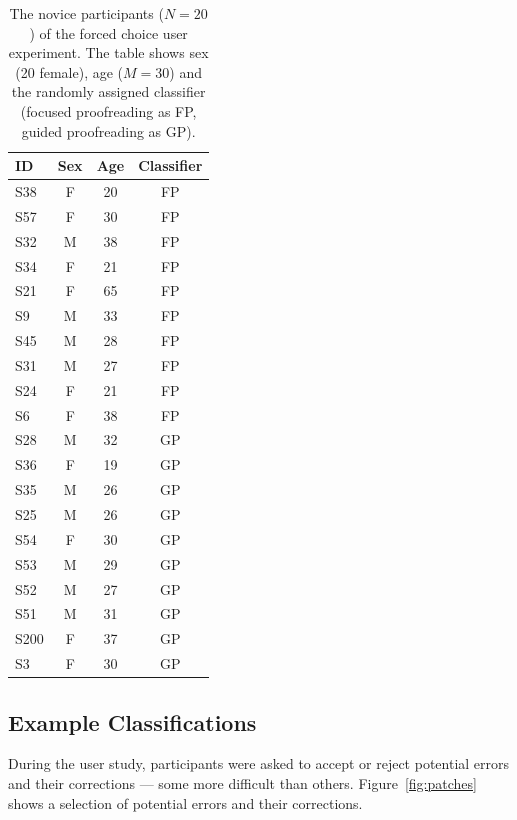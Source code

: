 \begin{table}[t]
\caption{The novice participants ($N=20$) of the forced choice user experiment. The table shows sex (20 female), age ($M=30$) and the randomly assigned classifier (focused proofreading as FP, guided proofreading as GP).}%

\small{
\begin{tabular}{@{}l|c|c|c@{}}
	\toprule
     \textbf{ID} & \textbf{Sex} &  \textbf{Age} & \textbf{Classifier}  \\ \midrule	
S38 &		F & 20 & FP \\
S57&		F & 30 & FP \\ 
S32&		M & 38 & FP \\
S34&		F & 21 & FP \\
S21&		F & 65 & FP \\
S9 &	M & 33 & FP \\
S45 &		M & 28 & FP \\
S31&		M & 27 & FP \\
S24&		F & 21 & FP \\
S6	&	F & 38 & FP \\
S28	&	M&	32& GP \\
S36	&	F&	19& GP \\
S35	&	M&	26& GP \\
S25	&	M&	26& GP \\
S54	&	F&	30& GP \\
S53	&	M&	29& GP \\
S52	&	M	&27& GP \\
S51&		M&	31& GP \\
S200	 &	F	&37& GP \\
S3	 &F&	30 & GP



\end{tabular}
\hspace{2mm}
}
\label{tab:participants}
\end{table}

\subsection{Example Classifications}

During the user study, participants were asked to accept or reject potential errors and their corrections --- some more difficult than others. Figure~\ref{fig:patches} shows a selection of potential errors and their corrections.

